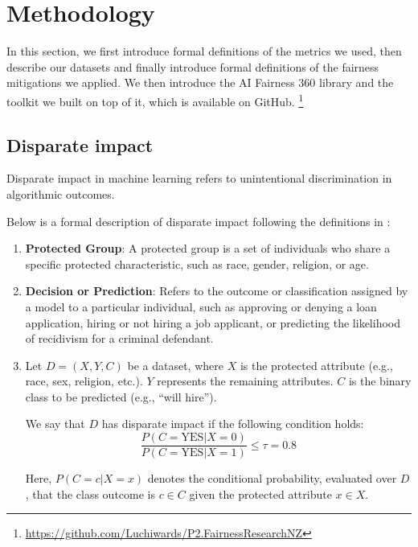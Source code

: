 \documentclass[runningheads]{llncs}
\begin{document}
\section{Methodology}
\label{sec:methodology}
In this section, we first introduce formal definitions of the metrics
we used, then describe our datasets and finally introduce formal
definitions of the fairness mitigations we applied. We then introduce
the AI Fairness 360 \cite{bellamy2018ai} library and the toolkit we
built on top of it, which is available on GitHub.%
\footnote{\url{https://github.com/Luchiwards/P2.FairnessResearchNZ}}


\subsection{Disparate impact}
\label{sec:disparate-impact}

Disparate impact in machine learning refers to unintentional
discrimination in algorithmic outcomes.

Below is a formal description of disparate impact following the
definitions in \cite{feldman2015certifying,zafar2017fairness}:

\begin{enumerate}
\item \textbf{Protected Group}: A protected group is a set of
    individuals who share a specific protected characteristic, such as
    race, gender, religion, or age.

\item \textbf{Decision or Prediction}: Refers to the outcome or
    classification assigned by a model to a particular individual,
    such as approving or denying a loan application, hiring or not
    hiring a job applicant, or predicting the likelihood of recidivism
    for a criminal defendant.

\item Let $D = (X, Y, C)$ be a dataset, where $X$ is the protected
    attribute (e.g., race, sex, religion, etc.). $Y$ represents the
    remaining attributes. $C$ is the binary class to be predicted
    (e.g., ``will hire'').


    We say that $D$ has disparate impact if the following condition
    holds:
    \begin{equation}
        \frac{P(C = \mbox{YES} | X = 0)}{P(C = \mbox{YES} | X = 1)} \leq \tau = 0.8
    \end{equation}

    Here, $P(C = c | X = x)$ denotes the conditional probability,
    evaluated over $D$, that the class outcome is $c \in C$ given the
    protected attribute $x \in X$.

\end{enumerate}
\end{document}
